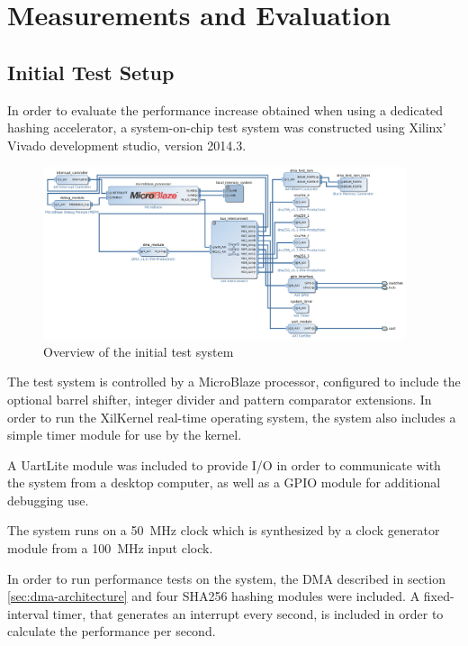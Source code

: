 \chapter{Measurements and Evaluation}
\label{cha:evaluation}

\section{Initial Test Setup}
In order to evaluate the performance increase obtained when using a dedicated
hashing accelerator, a system-on-chip test system was constructed using Xilinx' Vivado
development studio, version 2014.3.

\begin{figure}
	\includegraphics[width=0.95\textwidth]{Figures/testsystem-vivado.png}
	\caption{Overview of the initial test system}
	\label{fig:testsystem-vivado}
\end{figure}

The test system is controlled by a MicroBlaze processor, configured to
include the optional barrel shifter, integer divider and pattern comparator extensions.
In order to run the XilKernel real-time operating system, the system also
includes a simple timer module for use by the kernel.

A UartLite module was included to provide I/O in order to communicate with
the system from a desktop computer, as well as a GPIO module for additional
debugging use.

The system runs on a 50~MHz clock which is synthesized by a clock generator
module from a 100~MHz input clock.

In order to run performance tests on the system, the DMA described in
section \ref{sec:dma-architecture} and four SHA256 hashing modules were included.
A fixed-interval timer, that generates an interrupt every second, is
included in order to calculate the performance per second.

